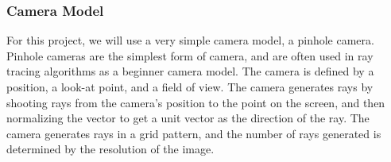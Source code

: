 \documentclass[../main.tex]{subfiles}
\begin{document}
\subsubsection{Camera Model}
For this project, we will use a very simple camera model, a pinhole camera. Pinhole cameras are the simplest form of camera, and are often used 
in ray tracing algorithms as a beginner camera model. The camera is defined by a position, a look-at point, and a field of view. 
The camera generates rays by shooting rays from the camera's position to the point on the screen, and then normalizing the vector to get a unit vector 
as the direction of the ray. The camera generates rays in a grid pattern, and the number of rays generated is determined by the resolution of the image\cite{petershirleytrevordavidblackstevehollaschRayTracingOne}.
\end{document}
